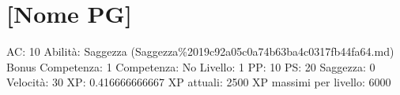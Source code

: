 \section{{[}Nome PG{]}}\label{nome-pg}

AC: 10 Abilità: Saggezza
(Saggezza\%2019c92a05c0a74b63ba4c0317fb44fa64.md) Bonus Competenza: 1
Competenza: No Livello: 1 PP: 10 PS: 20 Saggezza: 0 Velocità: 30 XP:
0.416666666667 XP attuali: 2500 XP massimi per livello: 6000
